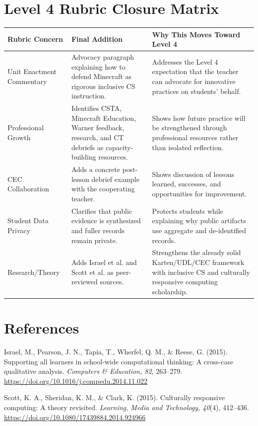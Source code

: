 \documentclass[12pt]{article}
\begin{document}
\section{Level 4 Rubric Closure Matrix}

\begin{xltabular}{\textwidth}{|P{1.6in}|P{2.2in}|L|}
\hline
{}\color{white}\bfseries Rubric Concern & \color{white}\bfseries Final Addition & \color{white}\bfseries Why This Moves Toward Level 4 \\
\hline
Unit Enactment Commentary & Advocacy paragraph explaining how to defend Minecraft as rigorous inclusive CS instruction. & Addresses the Level 4 expectation that the teacher can advocate for innovative practices on students' behalf. \\
\hline
{} Professional Growth & Identifies CSTA, Minecraft Education, Warner feedback, research, and CT debriefs as capacity-building resources. & Shows how future practice will be strengthened through professional resources rather than isolated reflection. \\
\hline
CEC Collaboration & Adds a concrete post-lesson debrief example with the cooperating teacher. & Shows discussion of lessons learned, successes, and opportunities for improvement. \\
\hline
{} Student Data Privacy & Clarifies that public evidence is synthesized and fuller records remain private. & Protects students while explaining why public artifacts use aggregate and de-identified records. \\
\hline
Research/Theory & Adds Israel et al. and Scott et al. as peer-reviewed sources. & Strengthens the already solid Karten/UDL/CEC framework with inclusive CS and culturally responsive computing scholarship. \\
\hline
\end{xltabular}

\section{References}

Israel, M., Pearson, J. N., Tapia, T., Wherfel, Q. M., \& Reese, G. (2015). Supporting all learners in school-wide computational thinking: A cross-case qualitative analysis. \emph{Computers \& Education, 82}, 263--279. \url{https://doi.org/10.1016/j.compedu.2014.11.022}

Scott, K. A., Sheridan, K. M., \& Clark, K. (2015). Culturally responsive computing: A theory revisited. \emph{Learning, Media and Technology, 40}(4), 412--436. \url{https://doi.org/10.1080/17439884.2014.924966}
\end{document}
